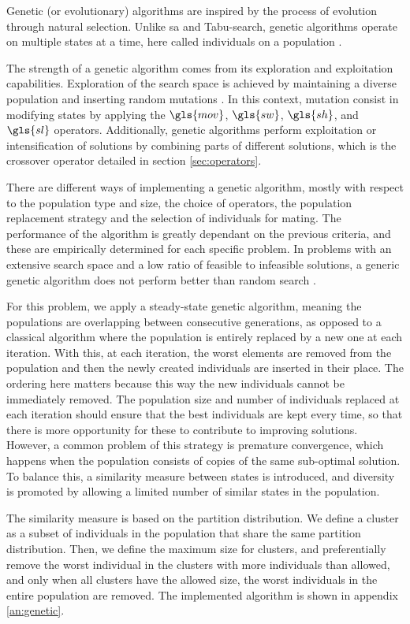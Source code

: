 \documentclass[main.tex]{subfiles}
\begin{document}
Genetic (or evolutionary) algorithms are inspired by the process of evolution through natural selection.
Unlike \gls{sa} and Tabu-search, genetic algorithms operate on multiple states at a time, here called individuals on a population \cite{wall1996genetic}.

The strength of a genetic algorithm comes from its exploration and exploitation capabilities. 
Exploration of the search space is achieved by maintaining a diverse population and inserting random mutations \cite{fogel1994introduction}.
In this context, mutation consist in modifying states by applying the $\gls{mov}$, $\gls{sw}$, $\gls{sh}$, and $\gls{sl}$ operators.
Additionally, genetic algorithms perform exploitation or intensification of solutions by combining parts of different solutions, which is the crossover operator detailed in section \ref{sec:operators}.

There are different ways of implementing a genetic algorithm, mostly with respect to the population type and size, the choice of operators, the population replacement strategy and the selection of individuals for mating.
The performance of the algorithm is greatly dependant on the previous criteria, and these are empirically determined for each specific problem.
In problems with an extensive search space and a low ratio of feasible to infeasible solutions, a generic genetic algorithm does not perform better than random search \cite{wall1996genetic}.

For this problem, we apply a steady-state genetic algorithm, meaning the populations are overlapping between consecutive generations, as opposed to a classical algorithm where the population is entirely replaced by a new one at each iteration.
With this, at each iteration, the worst elements are removed from the population and then the newly created individuals are inserted in their place. 
The ordering here matters because this way the new individuals cannot be immediately removed.
The population size and number of individuals replaced at each iteration should ensure that the best individuals are kept every time, so that there is more opportunity for these to contribute to improving solutions.
However, a common problem of this strategy is premature convergence, which happens when the population consists of copies of the same sub-optimal solution.
To balance this, a similarity measure between states is introduced, and diversity is promoted by allowing a limited number of similar states in the population.

The similarity measure is based on the partition distribution.
We define a cluster as a subset of individuals in the population that share the same partition distribution.
Then, we define the maximum size for clusters, and preferentially remove the worst individual in the clusters with more individuals than allowed, and only when all clusters have the allowed size, the worst individuals in the entire population are removed.
The implemented algorithm is shown in appendix \ref{an:genetic}.
\end{document}
